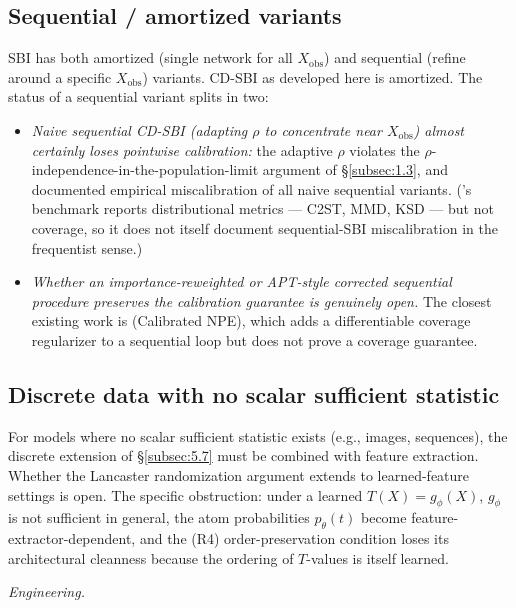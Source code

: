 \documentclass[11pt]{article}
\providecommand{\tightlist}{\setlength{\itemsep}{0pt}\setlength{\parskip}{0pt}}
\begin{document}
\subsection{Sequential / amortized variants}\label{subsec:11.6}
SBI has both amortized (single network for all \(X_\mathrm{obs}\)) and
sequential (refine around a specific \(X_\mathrm{obs}\)) variants.
CD-SBI as developed here is amortized. The status of a sequential
variant splits in two:
\begin{itemize}
\tightlist
\item \emph{Naive sequential CD-SBI (adapting \(\rho\) to concentrate
  near \(X_\mathrm{obs}\)) almost certainly loses pointwise calibration:}
  the adaptive \(\rho\) violates the \(\rho\)-independence-in-the-population-limit
  argument of \S\ref{subsec:1.3}, and \citet{HermansEtAl2022}
  documented empirical miscalibration of all naive sequential variants.
  (\citealp{LueckmannEtAl2021}'s benchmark reports distributional
  metrics --- C2ST, MMD, KSD --- but not coverage, so it does not
  itself document sequential-SBI miscalibration in the frequentist
  sense.)
\item \emph{Whether an importance-reweighted or APT-style corrected
  sequential procedure preserves the calibration guarantee is genuinely
  open.} The closest existing work is \citet{FalkiewiczEtAl2023}
  (Calibrated NPE), which adds a differentiable coverage regularizer to
  a sequential loop but does not prove a coverage guarantee.
\end{itemize}

\subsection{Discrete data with no scalar sufficient statistic}\label{subsec:11.7}
For models where no scalar sufficient statistic exists (e.g., images,
sequences), the discrete extension of \S\ref{subsec:5.7} must be
combined with feature extraction. Whether the Lancaster randomization
argument extends to learned-feature settings is open. The specific
obstruction: under a learned \(T(X) = g_\phi(X)\), \(g_\phi\) is not
sufficient in general, the atom probabilities \(p_\theta(t)\) become
feature-extractor-dependent, and the (R4) order-preservation condition
loses its architectural cleanness because the ordering of \(T\)-values
is itself learned.

\medskip
\noindent\textit{Engineering.}
\medskip
\end{document}
